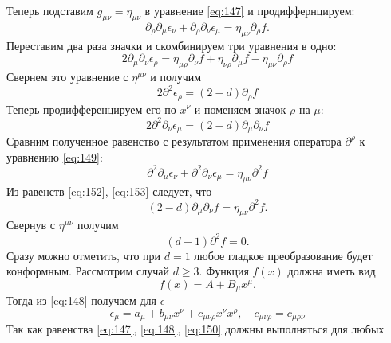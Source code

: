 \documentclass[a4paper,12pt]{article}
\theoremstyle{definition}
\theoremstyle{definition}
\theoremstyle{definition}
\begin{document}
Теперь подставим $g_{\mu\nu}=\eta_{\mu\nu}$ в уравнение \eqref{eq:147} и продиффернцируем:
\begin{equation}
  \label{eq:149}
  \partial_{\rho} \partial_{\mu}\epsilon_{\nu}+\partial_{\rho}\partial_{\nu}\epsilon_{\mu}=\eta_{\mu\nu}\partial_{\rho} f.
\end{equation}
Переставим два раза значки и скомбинируем три уравнения в одно:
\begin{equation}
  \label{eq:150}
  2\partial_{\mu}\partial_{\nu}\epsilon_{\rho}=\eta_{\mu\rho}\partial_{\nu} f+\eta_{\nu\rho}\partial_{\mu}f-\eta_{\mu\nu}\partial_{\rho}f
\end{equation}
Свернем это уравнение с $\eta^{\mu\nu}$ и получим
\begin{equation}
  \label{eq:151}
  2\partial^2 \epsilon_{\rho}=(2-d)\partial_{\rho}f
\end{equation}
Теперь продифференцируем его по $x^{\nu}$ и поменяем значок $\rho$ на $\mu$:
\begin{equation}
  \label{eq:152}
  2\partial^2 \partial_{\nu} \epsilon_{\mu}=(2-d)\partial_{\mu}\partial_{\nu} f
\end{equation}
Сравним полученное равенство с результатом применения оператора $\partial^{\rho}$ к уравнению
\eqref{eq:149}: 
\begin{equation}
  \label{eq:153}
  \partial^2 \partial_{\mu}\epsilon_{\nu}+\partial^2 \partial_{\nu}\epsilon_{\mu}=\eta_{\mu\nu}\partial^2 f
\end{equation}
Из равенств \eqref{eq:152}, \eqref{eq:153} следует, что
\begin{equation}
  \label{eq:154}
  (2-d)\partial_{\mu}\partial_{\nu}f=\eta_{\mu\nu}\partial^2 f.
\end{equation}
Свернув с $\eta^{\mu\nu}$ получим
\begin{equation}
  \label{eq:155}
  (d-1)\partial^2 f =0.
\end{equation}
Сразу можно отметить, что при $d=1$ любое гладкое преобразование будет конформным. Рассмотрим случай
$d\geq 3$. Функция $f(x)$ должна иметь вид 
\begin{equation}
  \label{eq:156}
  f(x)=A+B_{\mu}x^{\mu}.
\end{equation}
Тогда из \eqref{eq:148} получаем для $\epsilon$
\begin{equation}
  \label{eq:157}
  \epsilon_{\mu}=a_{\mu}+b_{\mu\nu}x^{\nu} +c_{\mu\nu\rho}x^{\nu}x^{\rho},\quad c_{\mu\nu\rho}=c_{\mu\rho\nu}
\end{equation}
Так как равенства \eqref{eq:147}, \eqref{eq:148}, \eqref{eq:150} должны выполняться для любых
\end{document}
